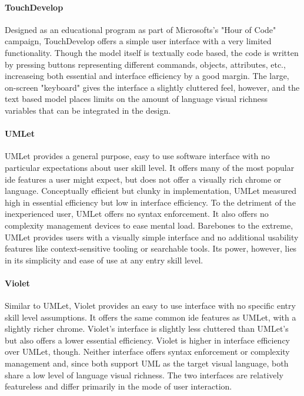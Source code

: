 \paragraph{TouchDevelop} Designed as an educational program as part of Microsofts's "Hour of Code" campaign, TouchDevelop offers a simple user interface with a very limited functionality. Though the model itself is textually code based, the code is written by pressing buttons representing different commands, objects, attributes, etc., increaseing both essential and interface efficiency by a good margin. The large, on-screen "keyboard" gives the interface a slightly cluttered feel, however, and the text based model places limits on the amount of language visual richness variables that can be integrated in the design.

\paragraph{UMLet} UMLet provides a general purpose, easy to use software
interface with no particular expectations about user skill level. It offers
many of the most popular \ac{ide} features a user might expect, but does
not offer a visually rich chrome or language. Conceptually efficient but
clunky in implementation, UMLet measured high in essential efficiency but
low in interface efficiency. To the detriment of the inexperienced user,
UMLet offers no syntax enforcement. It also offers no complexity management
devices to ease mental load. Barebones to the extreme, UMLet provides users
with a visually simple interface and no additional usability features like
context-sensitive tooling or searchable tools. Its power, however, lies in
its simplicity and ease of use at any entry skill level.

\paragraph{Violet} Similar to UMLet, Violet provides an easy to use
interface with no specific entry skill level assumptions. It offers the
same common \ac{ide} features as UMLet, with a slightly richer chrome.
Violet's interface is slightly less cluttered than UMLet's but also offers
a lower essential efficiency. Violet is higher in interface efficiency over
UMLet, though. Neither interface offers syntax enforcement or complexity
management and, since both support UML as the target visual language, both
share a low level of language visual richness. The two interfaces are
relatively featureless and differ primarily in the mode of user
interaction.

